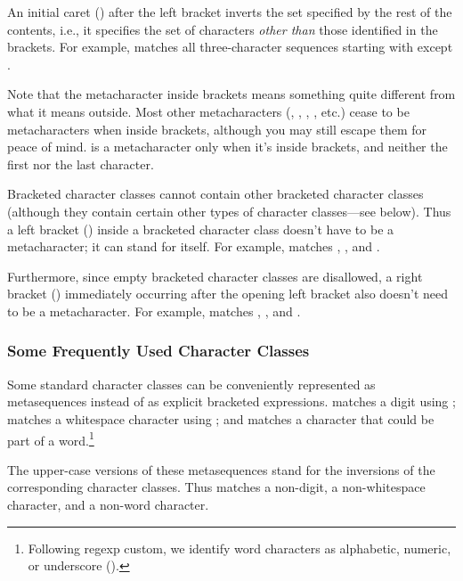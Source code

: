 An initial caret (\code{\textasciicircum}) after the left bracket
inverts the set specified by the rest of the contents, i.e., it
specifies the set of characters \emph{other than} those identified in
the brackets.  For example,  matches
all three-character sequences starting with  except
.

Note that the metacharacter \code{\textasciicircum} inside brackets
means something quite different from what it means outside.  Most
other metacharacters (, \code{*}, \code{+}, , etc.)
cease to be metacharacters when inside brackets, although you may
still escape them for peace of mind.  \code{-} is a metacharacter only
when it's inside brackets, and neither the first nor the last
character.

Bracketed character classes cannot contain other bracketed character
classes (although they contain certain other types of character
classes---see below).  Thus a left bracket (\code{[}) inside a
bracketed character class doesn't have to be a metacharacter; it can
stand for itself.  For example, \code{"[a[b]"} matches ,
\code{[}, and .

Furthermore, since empty bracketed character classes are disallowed, a
right bracket (\code{]}) immediately occurring after the opening left
bracket also doesn't need to be a metacharacter.  For example,
\code{"[]ab]"} matches \code{]}, , and .

\subsubsection {Some Frequently Used Character Classes}

Some standard character classes can be conveniently represented as
metasequences instead of as explicit bracketed
expressions.  matches a digit using
;  matches a whitespace
character using ; and 
matches a character that could be part of a word.\footnote{Following
  regexp custom, we identify word characters as alphabetic, numeric,
  or underscore (\code{\_}).}

The upper-case versions of these metasequences stand for the
inversions of the corresponding character classes. Thus
 matches a non-digit, 
a non-whitespace character, and  a non-word
character.

